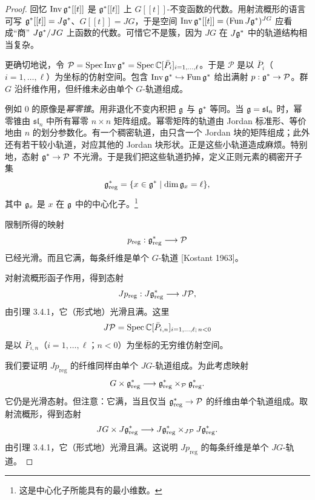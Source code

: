 \begin{proof}
    回忆 $\operatorname{Inv}\mathfrak{g}^*[[t]]$ 是 $\mathfrak{g}^*[[t]]$ 上 $G[[t]]$-不变函数的代数。用射流概形的语言可写 $\mathfrak{g}^*[[t]]=J\mathfrak{g}^*$、$G[[t]]=JG$，于是空间 $\operatorname{Inv}\mathfrak{g}^*[[t]]=(\operatorname{Fun}J\mathfrak{g}^*)^{JG}$ 应看成“商” $J\mathfrak{g}^*/JG$ 上函数的代数。可惜它不是簇，因为 $JG$ 在 $J\mathfrak{g}^*$ 中的轨道结构相当复杂。

    更确切地说，令 $\mathcal{P}=\operatorname{Spec}\operatorname{Inv}\mathfrak{g}^*=\operatorname{Spec}\mathbb{C}[\bar P_i]_{i=1,\dots,\ell}$。于是 $\mathcal{P}$ 是以 $\bar P_i$（$i=1,\dots,\ell$）为坐标的仿射空间。包含 $\operatorname{Inv}\mathfrak{g}^*\hookrightarrow\operatorname{Fun}\mathfrak{g}^*$ 给出满射 $p:\mathfrak{g}^*\to\mathcal{P}$。群 $G$ 沿纤维作用，但纤维未必由单个 $G$-轨道组成。

    例如 $0$ 的原像是\emph{幂零锥}。用非退化不变内积把 $\mathfrak{g}$ 与 $\mathfrak{g}^*$ 等同。当 $\mathfrak{g}=\mathfrak{sl}_n$ 时，幂零锥由 $\mathfrak{sl}_n$ 中所有幂零 $n\times n$ 矩阵组成。幂零矩阵的轨道由 Jordan 标准形、等价地由 $n$ 的划分参数化。有一个稠密轨道，由只含一个 Jordan 块的矩阵组成；此外还有若干较小轨道，对应其他的 Jordan 块形状。正是这些小轨道造成麻烦。特别地，态射 $\mathfrak{g}^*\to\mathcal{P}$ 不光滑。于是我们把这些轨道扔掉，定义正则元素的稠密开子集
    \[
        \mathfrak{g}^*_{\mathrm{reg}}=\{x\in\mathfrak{g}^*\mid \dim\mathfrak{g}_x=\ell\},
    \]
    其中 $\mathfrak{g}_x$ 是 $x$ 在 $\mathfrak{g}$ 中的中心化子。\footnote{这是中心化子所能具有的最小维数。}

    限制所得的映射
    \[
        p_{\mathrm{reg}}:\mathfrak{g}^*_{\mathrm{reg}}\longrightarrow\mathcal{P}
    \]
    已经光滑。而且它满，每条纤维是单个 $G$-轨道 [Kostant 1963]。

    对射流概形函子作用，得到态射
    \[
        Jp_{\mathrm{reg}}:J\mathfrak{g}^*_{\mathrm{reg}}\longrightarrow J\mathcal{P},
    \]
    由引理 3.4.1，它（形式地）光滑且满。这里
    \[
        J\mathcal{P}=\operatorname{Spec}\mathbb{C}[\bar P_{i,n}]_{i=1,\dots,\ell;\,n<0}
    \]
    是以 $\bar P_{i,n}$（$i=1,\dots,\ell$；$n<0$）为坐标的无穷维仿射空间。

    我们要证明 $Jp_{\mathrm{reg}}$ 的纤维同样由单个 $JG$-轨道组成。为此考虑映射
    \[
        G\times\mathfrak{g}^*_{\mathrm{reg}}\longrightarrow\mathfrak{g}^*_{\mathrm{reg}}\times_{\mathcal{P}}\mathfrak{g}^*_{\mathrm{reg}}.
    \]
    它仍是光滑态射。但注意：它满，当且仅当 $\mathfrak{g}^*_{\mathrm{reg}}\to\mathcal{P}$ 的纤维由单个轨道组成。取射流概形，得到态射
    \[
        JG\times J\mathfrak{g}^*_{\mathrm{reg}}\longrightarrow J\mathfrak{g}^*_{\mathrm{reg}}\times_{J\mathcal{P}}J\mathfrak{g}^*_{\mathrm{reg}}.
    \]
    由引理 3.4.1，它（形式地）光滑且满。这说明 $Jp_{\mathrm{reg}}$ 的每条纤维是单个 $JG$-轨道。


\end{proof}
